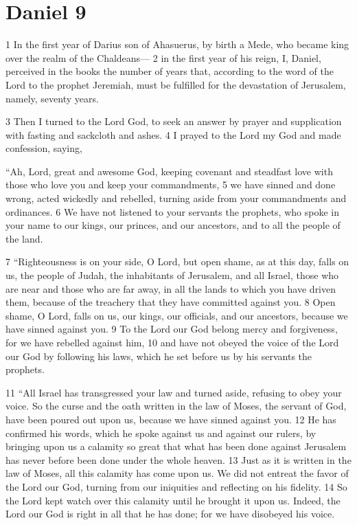\chapter{Daniel 9}
\label{ch:daniel9}

1 In the first year of Darius son of Ahasuerus, by birth a Mede, who became king 
over the realm of the Chaldeans--- 2 in the first year of his reign, I, Daniel,
perceived in the books the number of years that, according to the word of the 
Lord to the prophet Jeremiah, must be fulfilled for the devastation of Jerusalem,
namely, seventy years.

3 Then I turned to the Lord God, to seek an answer by prayer and supplication 
with fasting and sackcloth and ashes. 4 I prayed to the Lord my God and made 
confession, saying,

``Ah, Lord, great and awesome God, keeping covenant and steadfast love with 
those who love you and keep your commandments, 5 we have sinned and done 
wrong, acted wickedly and rebelled, turning aside from your commandments 
and ordinances. 6 We have not listened to your servants the prophets, who spoke 
in your name to our kings, our princes, and our ancestors, and to all the people 
of the land.

7 ``Righteousness is on your side, O Lord, but open shame, as at this day, falls 
on us, the people of Judah, the inhabitants of Jerusalem, and all Israel, those 
who are near and those who are far away, in all the lands to which you have 
driven them, because of the treachery that they have committed against you. 
8 Open shame, O Lord, falls on us, our kings, our officials, and our ancestors, 
because we have sinned against you. 9 To the Lord our God belong mercy and 
forgiveness, for we have rebelled against him, 10 and have not obeyed the voice 
of the Lord our God by following his laws, which he set before us by his 
servants the prophets.

11 ``All Israel has transgressed your law and turned aside, refusing to obey 
your voice. So the curse and the oath written in the law of Moses, the servant 
of God, have been poured out upon us, because we have sinned against you. 12 He 
has confirmed his words, which he spoke against us and against our rulers, by 
bringing upon us a calamity so great that what has been done against Jerusalem 
has never before been done under the whole heaven. 13 Just as it is written in 
the law of Moses, all this calamity has come upon us. We did not entreat the 
favor of the Lord our God, turning from our iniquities and reflecting on his 
fidelity. 14 So the Lord kept watch over this calamity until he brought it upon 
us. Indeed, the Lord our God is right in all that he has done; for we have 
disobeyed his voice.


